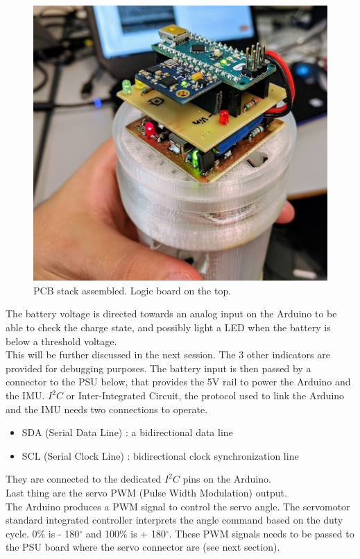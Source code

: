 \begin{figure} [h]
	\centering
	\includegraphics[width=0.8\linewidth]{figures/Rocket/implementation/assembled_PCBs.jpg}
	\caption{PCB stack assembled. Logic board on the top.}
	\label{fig:PCB_stack}
\end{figure}

The battery voltage is directed towards an analog input on the Arduino to be able to check the charge state, and possibly light a LED when the battery is below a threshold voltage. \\
This will be further discussed in the next session. The 3 other indicators are provided for debugging purposes.
The battery input is then passed by a connector to the PSU below, that provides the 5V rail to power the Arduino and the IMU.
$I^2C$ or Inter-Integrated Circuit, the protocol used to link the Arduino and the IMU needs two connections to operate.
\begin{itemize}
	\item SDA (Serial Data Line) : a bidirectional data line
	\item SCL (Serial Clock Line) : bidirectional clock synchronization line
\end{itemize}
They are connected to the dedicated $I^2C$ pins on the Arduino. \\
Last thing are the servo PWM (Pulse Width Modulation) output. \\
The Arduino produces a PWM signal to control the servo angle. The servomotor standard integrated controller interprets the angle command based on the duty cycle. 0\% is - 180$^{\circ}$ and 100\% is + 180$^{\circ}$. These PWM signals needs to be passed to the PSU board where the servo connector are (see next section).


